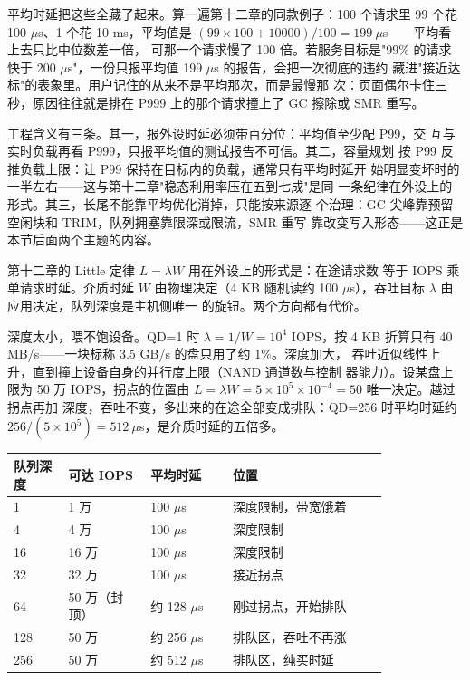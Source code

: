 平均时延把这些全藏了起来。算一遍第十二章的同款例子：100 个请求里 99
个花 100 $\mu$s、1 个花 10 ms，平均值是
$(99\times100+10000)/100=199\ \mu$s——平均看上去只比中位数差一倍，
可那一个请求慢了 100 倍。若服务目标是"99\% 的请求快于
200 $\mu$s"，一份只报平均值 199 $\mu$s 的报告，会把一次彻底的违约
藏进"接近达标"的表象里。用户记住的从来不是平均那次，而是最慢那
次：页面偶尔卡住三秒，原因往往就是排在 P999 上的那个请求撞上了 GC
擦除或 SMR 重写。

工程含义有三条。其一，报外设时延必须带百分位：平均值至少配 P99，交
互与实时负载再看 P999，只报平均值的测试报告不可信。其二，容量规划
按 P99 反推负载上限：让 P99 保持在目标内的负载，通常只有平均时延开
始明显变坏时的一半左右——这与第十二章"稳态利用率压在五到七成"是同
一条纪律在外设上的形式。其三，长尾不能靠平均优化消掉，只能按来源逐
个治理：GC 尖峰靠预留空闲块和 TRIM，队列拥塞靠限深或限流，SMR 重写
靠改变写入形态——这正是本节后面两个主题的内容。

第十二章的 Little 定律 $L=\lambda W$ 用在外设上的形式是：在途请求数
等于 IOPS 乘单请求时延。介质时延 $W$ 由物理决定（4 KB 随机读约
100 $\mu$s），吞吐目标 $\lambda$ 由应用决定，队列深度是主机侧唯一
的旋钮。两个方向都有代价。

深度太小，喂不饱设备。QD=1 时 $\lambda=1/W=10^{4}$ IOPS，按 4 KB
折算只有 40 MB/s——一块标称 3.5 GB/s 的盘只用了约 1\%。深度加大，
吞吐近似线性上升，直到撞上设备自身的并行度上限（NAND 通道数与控制
器能力）。设某盘上限为 50 万 IOPS，拐点的位置由
$L=\lambda W=5\times10^{5}\times10^{-4}=50$ 唯一决定。越过拐点再加
深度，吞吐不变，多出来的在途全部变成排队：QD=256 时平均时延约
$256/(5\times10^{5})=512\ \mu$s，是介质时延的五倍多。

\begin{longtable}{L{0.12\linewidth}L{0.18\linewidth}L{0.18\linewidth}L{0.34\linewidth}}
\toprule
队列深度 & 可达 IOPS & 平均时延 & 位置 \\
 & 1 万 & 100 $\mu$s & 深度限制，带宽饿着 \\
4 & 4 万 & 100 $\mu$s & 深度限制 \\
16 & 16 万 & 100 $\mu$s & 深度限制 \\
32 & 32 万 & 100 $\mu$s & 接近拐点 \\
64 & 50 万（封顶） & 约 128 $\mu$s & 刚过拐点，开始排队 \\
128 & 50 万 & 约 256 $\mu$s & 排队区，吞吐不再涨 \\
256 & 50 万 & 约 512 $\mu$s & 排队区，纯买时延 \\
\bottomrule
\end{longtable}

